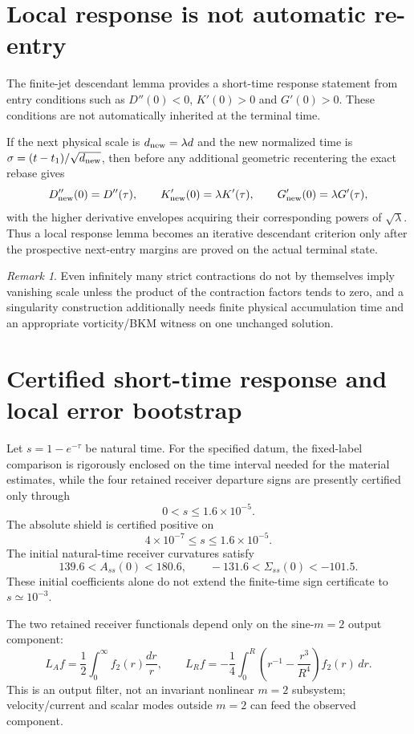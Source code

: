 \documentclass[11pt]{article}
\theoremstyle{definition}\newtheorem{definition}[theorem]{Definition}\newtheorem{problem}[theorem]{Problem}
\theoremstyle{remark}\newtheorem{remark}[theorem]{Remark}
\begin{document}
\section{Local response is not automatic re-entry}
\label{sec:reentry}

The finite-jet descendant lemma provides a short-time response statement from entry
conditions such as $D''(0)<0$, $K'(0)>0$ and $G'(0)>0$.  These conditions are
not automatically inherited at the terminal time.

If the next physical scale is $d_{\rm new}=\lambda d$ and the new normalized
time is $\sigma=(t-t_1)/\sqrt{d_{\rm new}}$, then before any additional
geometric recentering the exact rebase gives
\[
 D_{\rm new}''(0)=D''(\tau),\qquad
 K_{\rm new}'(0)=\lambda K'(\tau),\qquad
 G_{\rm new}'(0)=\lambda G'(\tau),
\]
with the higher derivative envelopes acquiring their corresponding powers of
$\sqrt\lambda$.  Thus a local response lemma becomes an iterative descendant criterion
only after the prospective next-entry margins are proved on the actual
terminal state.

\begin{remark}
Even infinitely many strict contractions do not by themselves imply vanishing
scale unless the product of the contraction factors tends to zero, and a
singularity construction additionally needs finite physical accumulation time
and an appropriate vorticity/BKM witness on one unchanged solution.
\end{remark}

\section{Certified short-time response and local error bootstrap}
Let $s=1-e^{-\tau}$ be natural time.  For the specified datum, the fixed-label comparison is rigorously enclosed on the time interval needed for the material estimates, while the four retained receiver departure signs are presently certified only through
\[
0<s\le1.6\times10^{-5}.
\]
The absolute shield is certified positive on
\[
4\times10^{-7}\le s\le1.6\times10^{-5}.
\]
The initial natural-time receiver curvatures satisfy
\[
139.6<A_{ss}(0)<180.6,
\qquad
-131.6<\Sigma_{ss}(0)<-101.5.
\]
These initial coefficients alone do not extend the finite-time sign certificate to $s\simeq10^{-3}$.

The two retained receiver functionals depend only on the sine-$m=2$ output component:
\[
L_A f=\frac12\int_0^\infty f_2(r)\frac{dr}{r},
\qquad
L_R f=-\frac14\int_0^R\left(r^{-1}-\frac{r^3}{R^4}\right)f_2(r)\,dr.
\]
This is an output filter, not an invariant nonlinear $m=2$ subsystem; velocity/current and scalar modes outside $m=2$ can feed the observed component.
\end{document}
